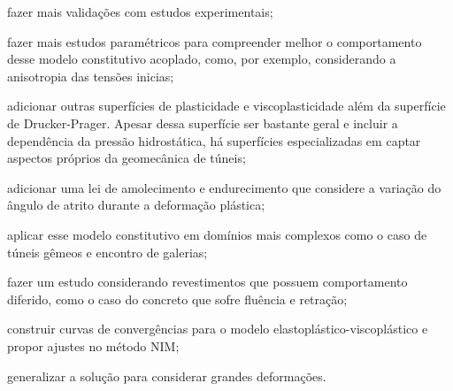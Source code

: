 \begin{alineas}
	
	\item fazer mais validações com estudos experimentais;
	
	\item fazer mais estudos paramétricos para compreender melhor o comportamento desse modelo constitutivo acoplado, como, por exemplo, considerando a anisotropia das tensões inicias;
	
	\item adicionar outras superfícies de plasticidade e viscoplasticidade além da superfície de Drucker-Prager. Apesar dessa superfície ser bastante geral e incluir a dependência da pressão hidrostática, há superfícies especializadas em captar aspectos próprios da geomecânica de túneis;
	
	\item adicionar uma lei de amolecimento e endurecimento que considere a variação do ângulo de atrito durante a deformação plástica;
	
	\item aplicar esse modelo constitutivo em domínios mais complexos como o caso de túneis gêmeos e encontro de galerias;
	
	\item fazer um estudo considerando revestimentos que possuem comportamento diferido, como o caso do concreto que sofre fluência e retração;
	
	\item construir curvas de convergências para o modelo elastoplástico-viscoplástico e propor ajustes no método NIM;
	
	\item generalizar a solução para considerar grandes deformações.	
	
\end{alineas}